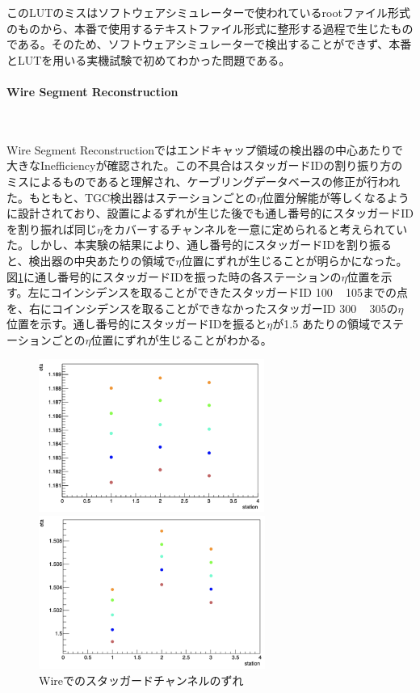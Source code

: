 このLUTのミスはソフトウェアシミュレーターで使われているrootファイル形式のものから、本番で使用するテキストファイル形式に整形する過程で生じたものである。そのため、ソフトウェアシミュレーターで検出することができず、本番とLUTを用いる実機試験で初めてわかった問題である。

\paragraph{Wire Segment Reconstruction}　　
\par
Wire Segment Reconstructionではエンドキャップ領域の検出器の中心あたりで大きなInefficiencyが確認された。この不具合はスタッガードIDの割り振り方のミスによるものであると理解され、ケーブリングデータベースの修正が行われた。もともと、TGC検出器はステーションごとの$\eta$位置分解能が等しくなるように設計されており、設置によるずれが生じた後でも通し番号的にスタッガードIDを割り振れば同じ$\eta$をカバーするチャンネルを一意に定められると考えられていた。しかし、本実験の結果により、通し番号的にスタッガードIDを割り振ると、検出器の中央あたりの領域で$\eta$位置にずれが生じることが明らかになった。図\ref{Stag300}に通し番号的にスタッガードIDを振った時の各ステーションの$\eta$位置を示す。左にコインシデンスを取ることができたスタッガードID 100 ~ 105までの点を、右にコインシデンスを取ることができなかったスタッガーID 300 ~ 305の$\eta$位置を示す。通し番号的にスタッガードIDを振ると$\eta$が1.5 あたりの領域でステーションごとの$\eta$位置にずれが生じることがわかる。

\begin{figure}
\begin{minipage}[b]{.5\linewidth}
\centering
\includegraphics[height=5cm]{fig/Test/Stag100-105.png}
\end{minipage}%
\begin{minipage}[b]{.5\linewidth}
\centering
\includegraphics[height=5cm]{fig/Test/Stag300-305.png}
\end{minipage}%
\caption[Wireでのスタッガードチャンネルのずれ]{Wireでのスタッガードチャンネルのずれ}
\label{Stag300}
\end{figure}

